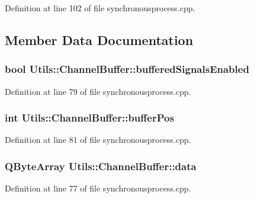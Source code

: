 \-Definition at line 102 of file synchronousprocess.\-cpp.



\subsection{\-Member \-Data \-Documentation}
\hypertarget{struct_utils_1_1_channel_buffer_a604565db9d7f8ee949013e67140d4dbf}{
\subsubsection[{buffered\-Signals\-Enabled}]{\setlength{\rightskip}{0pt plus 5cm}bool {\bf \-Utils\-::\-Channel\-Buffer\-::buffered\-Signals\-Enabled}}}\label{struct_utils_1_1_channel_buffer_a604565db9d7f8ee949013e67140d4dbf}


\-Definition at line 79 of file synchronousprocess.\-cpp.

\hypertarget{struct_utils_1_1_channel_buffer_aa968a408a1f0a7cfa1dc83c2ea665ef5}{
\subsubsection[{buffer\-Pos}]{\setlength{\rightskip}{0pt plus 5cm}int {\bf \-Utils\-::\-Channel\-Buffer\-::buffer\-Pos}}}\label{struct_utils_1_1_channel_buffer_aa968a408a1f0a7cfa1dc83c2ea665ef5}


\-Definition at line 81 of file synchronousprocess.\-cpp.

\hypertarget{struct_utils_1_1_channel_buffer_aec15c168afb035f27ef4cefc5825ac66}{
\subsubsection[{data}]{\setlength{\rightskip}{0pt plus 5cm}\-Q\-Byte\-Array {\bf \-Utils\-::\-Channel\-Buffer\-::data}}}\label{struct_utils_1_1_channel_buffer_aec15c168afb035f27ef4cefc5825ac66}


\-Definition at line 77 of file synchronousprocess.\-cpp.

